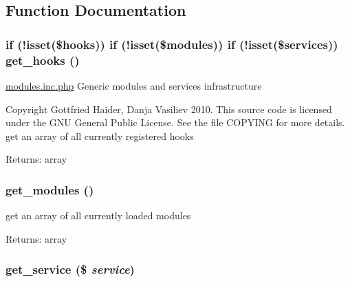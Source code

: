 \subsection{Function Documentation}
\hypertarget{modules_8inc_8php_dcaa12e356133b7fa0670571698b38cc}{
\subsubsection[{get\_\-hooks}]{\setlength{\rightskip}{0pt plus 5cm}if (!isset(\$hooks)) if (!isset(\$modules)) if (!isset(\$services)) get\_\-hooks ()}}
\label{modules_8inc_8php_dcaa12e356133b7fa0670571698b38cc}


\hyperlink{modules_8inc_8php}{modules.inc.php} Generic modules and services infrastructure

Copyright Gottfried Haider, Danja Vasiliev 2010. This source code is licensed under the GNU General Public License. See the file COPYING for more details. get an array of all currently registered hooks

\begin{Desc}
\item[Returns:]array \end{Desc}
\hypertarget{modules_8inc_8php_1b73e435e11b07906d0781b146b4aa21}{
\subsubsection[{get\_\-modules}]{\setlength{\rightskip}{0pt plus 5cm}get\_\-modules ()}}
\label{modules_8inc_8php_1b73e435e11b07906d0781b146b4aa21}


get an array of all currently loaded modules

\begin{Desc}
\item[Returns:]array \end{Desc}
\hypertarget{modules_8inc_8php_bf7633223c2fd4ecb199a8e0dc070802}{
\subsubsection[{get\_\-service}]{\setlength{\rightskip}{0pt plus 5cm}get\_\-service (\$ {\em service})}}
\label{modules_8inc_8php_bf7633223c2fd4ecb199a8e0dc070802}


